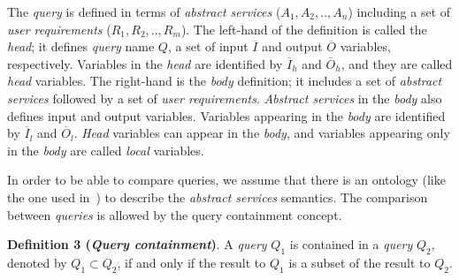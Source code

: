 The \textsl{query} is defined in terms of \textsl{abstract services} ($A_{1}, A_{2}, .., A_{n}$) including a set of \textsl{user requirements} ($R_{1},R_{2}, .., R_{m}$). 
The left-hand of the definition is called the \textit{head}; it defines \textsl{query} name $Q$, a set of input $\overline{I}$ and output $\overline{O}$ variables, respectively. Variables in the \textit{head} are identified by $\overline{I}_{h}$ and $\overline{O}_{h}$, and they are called \textit{head} variables. The right-hand is the \textit{body} definition; it includes a set of \textsl{abstract services} followed by a set of \textsl{user requirements}. \textsl{Abstract services} in the \textit{body} also defines input and output variables. Variables appearing in the \textit{body} are identified by $\overline{I}_{l}$ and $\overline{O}_{l}$. \textit{Head} variables can appear in the \textit{body}, and variables appearing only in the \textit{body} are called \textit{local} variables.
%

\bigskip
In order to be able to compare queries, we assume that there is an ontology (like the one used in~\cite{Barhamgi2010}) to describe the \textsl{abstract services} semantics. The comparison between \textsl{queries} is allowed by the query containment concept.

\bigskip
\noindent \textbf{Definition 3 (\textsl{Query containment})}.
A \textsl{query} $Q_{1}$ is contained in a \textsl{query} $Q_{2}$, denoted by $Q_{1} \subset Q_{2}$, if and only if the result to $Q_{1}$ is a subset of the result to $Q_{2}$.
%

